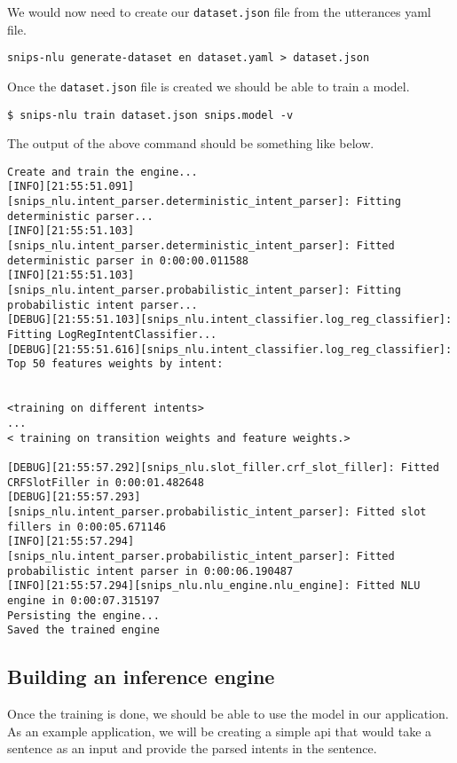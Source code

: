 \documentclass{book}
\begin{document}
We would now need to create our \lstinline{dataset.json} file from the utterances yaml file.

\begin{lstlisting}[caption={}, basicstyle=\small]
snips-nlu generate-dataset en dataset.yaml > dataset.json
\end{lstlisting}

Once the \lstinline{dataset.json} file is created we should be able to train a model.

\begin{lstlisting}[caption={}, basicstyle=\small]
$ snips-nlu train dataset.json snips.model -v
\end{lstlisting}

The output of the above command should be something like below.

\begin{lstlisting}[caption={}, basicstyle=\tiny]
Create and train the engine...
[INFO][21:55:51.091][snips_nlu.intent_parser.deterministic_intent_parser]: Fitting deterministic parser...
[INFO][21:55:51.103][snips_nlu.intent_parser.deterministic_intent_parser]: Fitted deterministic parser in 0:00:00.011588
[INFO][21:55:51.103][snips_nlu.intent_parser.probabilistic_intent_parser]: Fitting probabilistic intent parser...
[DEBUG][21:55:51.103][snips_nlu.intent_classifier.log_reg_classifier]: Fitting LogRegIntentClassifier...
[DEBUG][21:55:51.616][snips_nlu.intent_classifier.log_reg_classifier]: Top 50 features weights by intent:


<training on different intents>
...
< training on transition weights and feature weights.>

[DEBUG][21:55:57.292][snips_nlu.slot_filler.crf_slot_filler]: Fitted CRFSlotFiller in 0:00:01.482648
[DEBUG][21:55:57.293][snips_nlu.intent_parser.probabilistic_intent_parser]: Fitted slot fillers in 0:00:05.671146
[INFO][21:55:57.294][snips_nlu.intent_parser.probabilistic_intent_parser]: Fitted probabilistic intent parser in 0:00:06.190487
[INFO][21:55:57.294][snips_nlu.nlu_engine.nlu_engine]: Fitted NLU engine in 0:00:07.315197
Persisting the engine...
Saved the trained engine 

\end{lstlisting}

\subsection{Building an inference engine}%
Once the training is done, we should be able to use the model in our application. As an example application, we will be creating a simple api that would take a sentence as an input and provide the parsed intents in the sentence.
\end{document}
